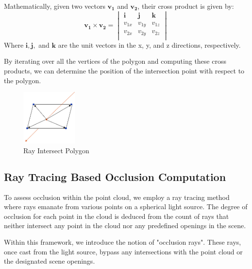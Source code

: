 \documentclass[11pt, a4paper,oneside,chapterprefix=false]{scrbook}
\begin{document}
\vspace{10pt}

Mathematically, given two vectors \( \mathbf{v_1} \) and \( \mathbf{v_2} \), their cross product is given by:
\[
\mathbf{v_1} \times \mathbf{v_2} = \begin{vmatrix}
\mathbf{i} & \mathbf{j} & \mathbf{k} \\
v_{1x} & v_{1y} & v_{1z} \\
v_{2x} & v_{2y} & v_{2z} \\
\end{vmatrix}
\]
Where \( \mathbf{i}, \mathbf{j}, \) and \( \mathbf{k} \) are the unit vectors in the x, y, and z directions, respectively.

By iterating over all the vertices of the polygon and computing these cross products, we can determine the position of the intersection point with respect to the polygon.

\begin{minipage}{\textwidth}
	\begin{figure}[H]
		\centering
		\includegraphics*[width=0.25\textwidth]{figures/intersect polygon.png}
		\caption{Ray Intersect Polygon}
		\label{fig:ray intersect polygon}
	\end{figure}
\end{minipage}


\subsection{Ray Tracing Based Occlusion Computation} \label{sec:ray tracing occlusion computation}

To assess occlusion within the point cloud, we employ a ray tracing method where rays emanate from various points on a spherical light source. The degree of occlusion for each point in the cloud is deduced from the count of rays that neither intersect any point in the cloud nor any predefined openings in the scene.

\vspace{10pt}

Within this framework, we introduce the notion of "occlusion rays". These rays, once cast from the light source, bypass any intersections with the point cloud or the designated scene openings.
\end{document}
